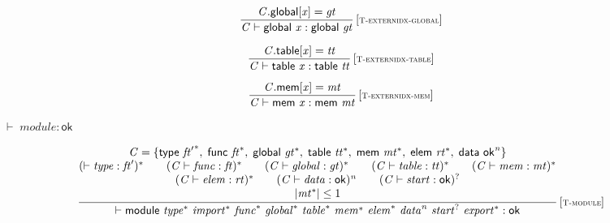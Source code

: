 $$
\begin{array}{@{}c@{}}\displaystyle
\frac{
{\mathit{C}}.\mathsf{global}{}[{\mathit{x}}] = {\mathit{gt}}
}{
{\mathit{C}} \vdash \mathsf{global}~{\mathit{x}} : \mathsf{global}~{\mathit{gt}}
} \, {[\textsc{\scriptsize T{-}externidx{-}global}]}
\qquad
\end{array}
$$

$$
\begin{array}{@{}c@{}}\displaystyle
\frac{
{\mathit{C}}.\mathsf{table}{}[{\mathit{x}}] = {\mathit{tt}}
}{
{\mathit{C}} \vdash \mathsf{table}~{\mathit{x}} : \mathsf{table}~{\mathit{tt}}
} \, {[\textsc{\scriptsize T{-}externidx{-}table}]}
\qquad
\end{array}
$$

$$
\begin{array}{@{}c@{}}\displaystyle
\frac{
{\mathit{C}}.\mathsf{mem}{}[{\mathit{x}}] = {\mathit{mt}}
}{
{\mathit{C}} \vdash \mathsf{mem}~{\mathit{x}} : \mathsf{mem}~{\mathit{mt}}
} \, {[\textsc{\scriptsize T{-}externidx{-}mem}]}
\qquad
\end{array}
$$

\vspace{1ex}

$\boxed{{ \vdash }\;{\mathit{module}} : \mathsf{ok}}$

$$
\begin{array}{@{}c@{}}\displaystyle
\frac{
\begin{array}{@{}c@{}}
{\mathit{C}} = \{ \begin{array}[t]{@{}l@{}}
\mathsf{type}~{{\mathit{ft}'}^\ast},\; \mathsf{func}~{{\mathit{ft}}^\ast},\; \mathsf{global}~{{\mathit{gt}}^\ast},\; \mathsf{table}~{{\mathit{tt}}^\ast},\; \mathsf{mem}~{{\mathit{mt}}^\ast},\; \mathsf{elem}~{{\mathit{rt}}^\ast},\; \mathsf{data}~{\mathsf{ok}^{{\mathit{n}}}} \}\end{array}
 \\
({ \vdash }\;{\mathit{type}} : {\mathit{ft}'})^\ast
 \qquad
({\mathit{C}} \vdash {\mathit{func}} : {\mathit{ft}})^\ast
 \qquad
({\mathit{C}} \vdash {\mathit{global}} : {\mathit{gt}})^\ast
 \qquad
({\mathit{C}} \vdash {\mathit{table}} : {\mathit{tt}})^\ast
 \qquad
({\mathit{C}} \vdash {\mathit{mem}} : {\mathit{mt}})^\ast
 \\
({\mathit{C}} \vdash {\mathit{elem}} : {\mathit{rt}})^\ast
 \qquad
({\mathit{C}} \vdash {\mathit{data}} : \mathsf{ok})^{{\mathit{n}}}
 \qquad
({\mathit{C}} \vdash {\mathit{start}} : \mathsf{ok})^?
 \\
{|{{\mathit{mt}}^\ast}|} \leq 1
\end{array}
}{
{ \vdash }\;\mathsf{module}~{{\mathit{type}}^\ast}~{{\mathit{import}}^\ast}~{{\mathit{func}}^\ast}~{{\mathit{global}}^\ast}~{{\mathit{table}}^\ast}~{{\mathit{mem}}^\ast}~{{\mathit{elem}}^\ast}~{{\mathit{data}}^{{\mathit{n}}}}~{{\mathit{start}}^?}~{{\mathit{export}}^\ast} : \mathsf{ok}
} \, {[\textsc{\scriptsize T{-}module}]}
\qquad
\end{array}
$$


